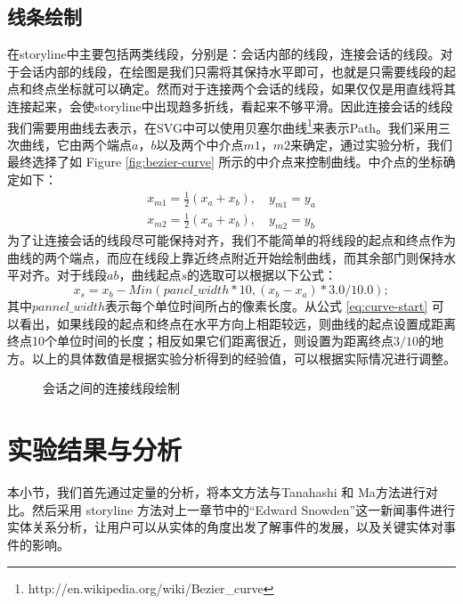 \subsection{线条绘制}
在storyline中主要包括两类线段，分别是：会话内部的线段，连接会话的线段。对于会话内部的线段，在绘图是我们只需将其保持水平即可，也就是只需要线段的起点和终点坐标就可以确定。然而对于连接两个会话的线段，如果仅仅是用直线将其连接起来，会使storyline中出现趋多折线，看起来不够平滑。因此连接会话的线段我们需要用曲线去表示，在SVG中可以使用贝塞尔曲线\footnote{http://en.wikipedia.org/wiki/Bezier\_curve}来表示Path。我们采用三次曲线，它由两个端点$a$，$b$以及两个中介点$m1$，$m2$来确定，通过实验分析，我们最终选择了如 Figure \ref{fig:bezier-curve} 所示的中介点来控制曲线。中介点的坐标确定如下：
\begin{subequations}
\begin{align}
	x_{m1} = \frac{1}{2}\left ( x_a + x_b \right ), \quad y_{m1} = y_a \\
	x_{m2} = \frac{1}{2}\left ( x_a + x_b \right ), \quad y_{m2} = y_b
\end{align}
\end{subequations}
为了让连接会话的线段尽可能保持对齐，我们不能简单的将线段的起点和终点作为曲线的两个端点，而应在线段上靠近终点附近开始绘制曲线，而其余部门则保持水平对齐。对于线段$ab$，曲线起点$s$的选取可以根据以下公式：
\begin{equation}
\label{eq:curve-start}
x_s = x_b - Min(panel\_width*10, (x_b - x_a)*3.0/10.0);
\end{equation}
其中$pannel\_width$表示每个单位时间所占的像素长度。从公式 \ref{eq:curve-start} 可以看出，如果线段的起点和终点在水平方向上相距较远，则曲线的起点设置成距离终点10个单位时间的长度；相反如果它们距离很近，则设置为距离终点$3/10$的地方。以上的具体数值是根据实验分析得到的经验值，可以根据实际情况进行调整。
\begin{figure}[htb]
	\centering
	\caption{会话之间的连接线段绘制}
	\label{fig:session-space}
\end{figure}

\section{实验结果与分析}
本小节，我们首先通过定量的分析，将本文方法与Tanahashi 和 Ma\cite{tanahashi2012design}方法进行对比。然后采用 storyline 方法对上一章节中的“Edward Snowden”这一新闻事件进行实体关系分析，让用户可以从实体的角度出发了解事件的发展，以及关键实体对事件的影响。
